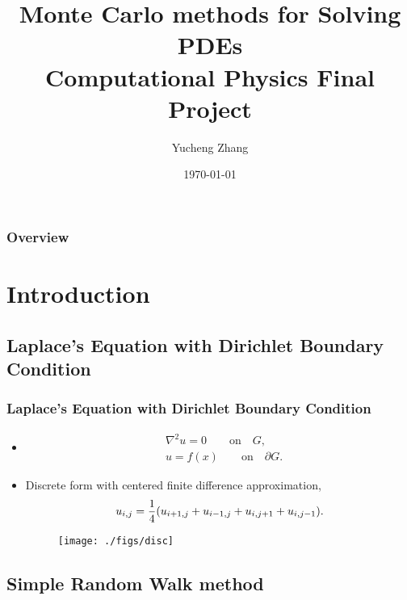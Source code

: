 \documentclass{beamer}
\title[MC methods for PDEs]{Monte Carlo methods for Solving PDEs\\Computational Physics Final Project}
\author{Yucheng Zhang}
\institute[Physics @ NYU]
{
Department of Physics, New York University \\
\medskip
\textit{yz4035@nyu.edu}
}
\date{\today}
\begin{document}
\begin{frame}
\titlepage
\end{frame}

\begin{frame}
\frametitle{Overview}
\tableofcontents
\end{frame}


\section{Introduction}


\subsection{Laplace's Equation with Dirichlet Boundary Condition}

\begin{frame}
\frametitle{Laplace's Equation with Dirichlet Boundary Condition}
\begin{itemize}
\item
\begin{equation*}
    \begin{split}
        &\nabla^2 u = 0 \qquad \text{on}\quad G, \\
        &u = f(x) \qquad \text{on}\quad \partial G.
    \end{split}
\end{equation*}
\item
Discrete form with centered finite difference approximation,
\begin{equation*}
    u_{i,j} = \frac{1}{4} \qty(u_{i+1,j}+u_{i-1,j}+u_{i,j+1}+u_{i,j-1}).
\end{equation*}
\begin{figure}[htbp]
    \centering
    \texttt{[image: ./figs/disc]}
\end{figure}
\end{itemize}
\end{frame}


\subsection{Simple Random Walk method}
\end{document}

